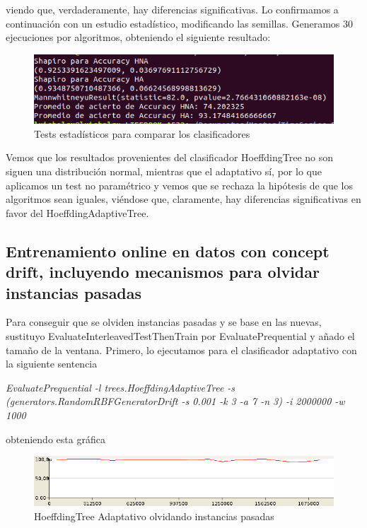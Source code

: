 viendo que, verdaderamente, hay diferencias significativas. Lo confirmamos a continuación con un estudio estadístico, modificando las semillas. Generamos 30 ejecuciones por algoritmos, obteniendo el siguiente resultado:

\begin{figure}[H] %
	\centering
	\includegraphics[scale=0.4]{cd5.png}  %
	\caption{Tests estadísticos para comparar los clasificadores} 
	\label{fig:cd5}
\end{figure}

Vemos que los resultados provenientes del clasificador HoeffdingTree no son siguen una distribución normal, mientras que el adaptativo sí, por lo que aplicamos un test no paramétrico y vemos que se rechaza la hipótesis de que los algoritmos sean iguales, viéndose que, claramente, hay diferencias significativas en favor del HoeffdingAdaptiveTree.

\subsection{Entrenamiento online en datos con concept drift, incluyendo mecanismos para olvidar instancias pasadas}

Para conseguir que se olviden instancias pasadas y se base en las nuevas, sustituyo EvaluateInterleavedTestThenTrain por EvaluatePrequential y añado el tamaño de la ventana. Primero, lo ejecutamos para el clasificador adaptativo con la siguiente sentencia

\textit{EvaluatePrequential -l trees.HoeffdingAdaptiveTree -s (generators.RandomRBFGeneratorDrift -s 0.001 -k 3 -a 7 -n 3) -i 2000000 -w 1000}

obteniendo esta gráfica

\begin{figure}[H] %
	\centering
	\includegraphics[scale=0.4]{graph4.png}  %
	\caption{HoeffdingTree Adaptativo olvidando instancias pasadas} 
	\label{fig:graph4}
\end{figure}

